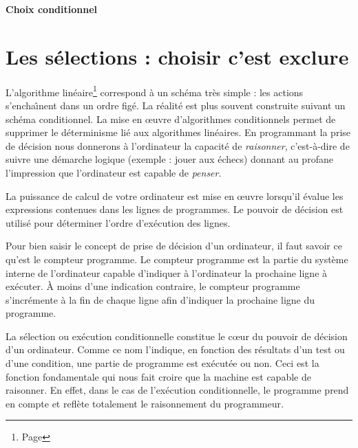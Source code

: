 \setcounter{section}{0}
\centerline{\Large\bf Choix conditionnel}
\label{Conditionnel}
 
 \noindent\hrulefill  
\section*{Les s\'elections : choisir c'est exclure}
L'algorithme lin\'eaire\footnote{Page \pageref{Lineaire}}
correspond \`a un sch\'ema tr\`es simple : les actions
s'encha\^\i nent dans un ordre fig\'e. La r\'ealit\'e est plus souvent construite
suivant un sch\'ema conditionnel. La mise en \oe uvre d'algorithmes
conditionnels permet de supprimer le d\'eterminisme li\'e aux algorithmes
lin\'eaires. En programmant la prise de d\'ecision nous donnerons \`a
l'ordinateur la capacit\'e de {\em raisonner}, c'est-\`a-dire de suivre une
d\'emarche logique (exemple : jouer aux \'echecs) donnant au profane
l'impression que l'ordinateur est capable de {\em penser}.


La puissance de calcul de votre ordinateur est mise en \oe uvre lorsqu'il
\'evalue les expressions contenues dans les lignes de programmes.
Le pouvoir de d\'ecision est utilis\'e pour d\'eterminer l'ordre
d'ex\'ecution des lignes. 

Pour bien saisir le concept de prise de d\'ecision d'un ordinateur, il
faut savoir ce qu'est le compteur programme. Le compteur programme est
la partie du syst\`eme interne de l'ordinateur capable d'indiquer \`a
l'ordinateur la prochaine ligne \`a ex\'ecuter. \`A moins d'une indication
contraire, le compteur programme s'incr\'emente \`a la fin de chaque ligne
afin d'indiquer la prochaine ligne du programme.


La s\'election ou ex\'ecution conditionnelle constitue le c\oe ur du pouvoir
de d\'ecision d'un ordinateur. Comme ce nom l'indique, en fonction des
r\'esultats d'un test ou d'une condition, une partie de programme est
ex\'ecut\'ee ou non. Ceci est la fonction fondamentale qui nous fait
croire que la machine est capable de raisonner. En effet, dans le cas de
l'ex\'ecution conditionnelle, le programme prend en compte et refl\`ete
totalement le raisonnement du programmeur.

